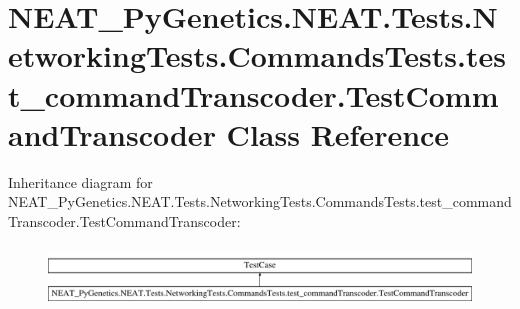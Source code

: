 \hypertarget{class_n_e_a_t___py_genetics_1_1_n_e_a_t_1_1_tests_1_1_networking_tests_1_1_commands_tests_1_1tesf3907a6c11390aeeb9f3c9bdc4f3b133}{}\section{N\+E\+A\+T\+\_\+\+Py\+Genetics.\+N\+E\+A\+T.\+Tests.\+Networking\+Tests.\+Commands\+Tests.\+test\+\_\+command\+Transcoder.\+Test\+Command\+Transcoder Class Reference}
\label{class_n_e_a_t___py_genetics_1_1_n_e_a_t_1_1_tests_1_1_networking_tests_1_1_commands_tests_1_1tesf3907a6c11390aeeb9f3c9bdc4f3b133}
Inheritance diagram for N\+E\+A\+T\+\_\+\+Py\+Genetics.\+N\+E\+A\+T.\+Tests.\+Networking\+Tests.\+Commands\+Tests.\+test\+\_\+command\+Transcoder.\+Test\+Command\+Transcoder\+:\begin{figure}[H]
\begin{center}
\leavevmode
\includegraphics[height=1.649485cm]{class_n_e_a_t___py_genetics_1_1_n_e_a_t_1_1_tests_1_1_networking_tests_1_1_commands_tests_1_1tesf3907a6c11390aeeb9f3c9bdc4f3b133}
\end{center}
\end{figure}
